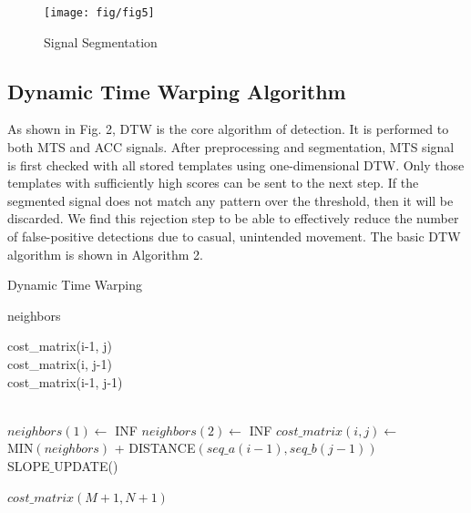 \begin{figure}[t]
\centering
\texttt{[image: fig/fig5]}
\caption{Signal Segmentation}
\end{figure}

\subsection{Dynamic Time Warping Algorithm}
As shown in Fig. 2, DTW is the core algorithm of detection.
It is performed to both MTS and ACC signals. After
preprocessing and segmentation, MTS signal is first checked
with all stored templates using one-dimensional DTW. Only
those templates with sufficiently high scores can be sent to
the next step. If the segmented signal does not match any
pattern over the threshold, then it will be discarded. We find
this rejection step to be able to effectively reduce the number of
false-positive detections due to casual, unintended movement.
The basic DTW algorithm is shown in Algorithm 2.

\begin{tiny}
\begin{algorithm}
  \caption{Dynamic Time Warping}
  \scriptsize
  \SetAlgoLined
  {
    {
       {
          \begin{algomathdisplay}
          neighbors \leftarrow
          \begin{pmatrix}
            cost\_matrix(i-1, j) \\
            cost\_matrix(i, j-1) \\
            cost\_matrix(i-1, j-1)
          \end{pmatrix}
          \end{algomathdisplay}\\
          {
             $neighbors(1)\leftarrow$ INF      
          }
          {
             $neighbors(2)\leftarrow$ INF      
          }
          $cost\_matrix(i, j)\leftarrow$\\
          MIN$(neighbors)$ + DISTANCE$(seq\_a(i-1), seq\_b(j-1))$\\
          SLOPE$\_$UPDATE()
       }
     }  
  }
  \Return $cost\_matrix(M+1, N+1)$
  \end{algorithm}
\end{tiny}

